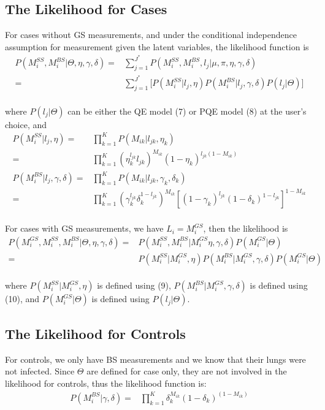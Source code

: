 \documentclass[11 pt, a4paper]{article}  %
\begin{document}
\subsection{The Likelihood for Cases}
For cases without GS measurements, and under the conditional independence assumption for measurement given the latent variables, the likelihood function is
\begin{align*}
 P(M_i^{SS},M_i^{BS} | \Theta, \eta, \gamma, \delta) 
 = & \sum_{j = 1}^{J^*}  P(M_i^{SS},M_i^{BS}, l_j | \mu, \pi, \eta, \gamma, \delta)  \\ 
= & \sum_{j = 1}^{J^*} \big[ P(M_i^{SS} | l_j, \eta) P(M_i^{BS} | l_j, \gamma, \delta) P(l_j |\Theta) \big ] 
\end{align*}
\\
where $P(l_j |\Theta)$ can be either the QE model (7) or PQE model (8) at the user's choice, and
\begin{align}
P(M_i^{SS} | l_j, \eta) = & \prod_{k=1}^K P(M_{ik} | l_{jk}, \eta_k) \nonumber \\
 = & \prod_{k=1}^K (\eta_k^{l_{jk}}l_{jk})^{M_{ik}} (1-\eta_k)^{l_{jk}(1-M_{ik})}\\
P(M_i^{BS} | l_j, \gamma, \delta) = & \prod_{k=1}^K P(M_{ik} | l_{jk}, \gamma_k, \delta_k) \nonumber \\
 = & \prod_{k=1}^K (\gamma_k^{l_{jk}} \delta_k^{1-l_{jk}})^{M_{ik}} [(1-\gamma_k)^{l_{jk}} (1-\delta_k)^{1-l_{jk}}]^{1-M_{ik}}
\end{align}
\\
For cases with GS measurements, we have $L_i = M_i^{GS}$, then the likelihood is 
\begin{align*}
 P(M_i^{GS},M_i^{SS},M_i^{BS} | \Theta, \eta, \gamma, \delta) 
= & P(M_i^{SS},M_i^{BS} | M_i^{GS} \eta, \gamma, \delta) P(M_i^{GS} | \Theta)\\
= & P(M_i^{SS}| M_i^{GS}, \eta) P(M_i^{BS} | M_i^{GS}, \gamma, \delta) P(M_i^{GS} | \Theta)
\end{align*}
\\
where $P(M_i^{SS}| M_i^{GS}, \eta)$ is defined using (9), $P(M_i^{BS} | M_i^{GS}, \gamma, \delta)$ is defined using (10), and $P(M_i^{GS} | \Theta)$ is defined using $P(l_j |\Theta)$.\\

\subsection{The Likelihood for Controls}
For controls, we only have BS measurements and we know that their lungs were not infected. Since $\Theta$ are defined for case only, they are not involved in the likelihood for controls, thus the likelihood function is:
\begin{align*}
 P(M_i^{BS} |\gamma, \delta) = & \prod_{k=1}^K \delta_k^{M_{ik}}(1-\delta_k)^{(1-M_{ik})}
\end{align*}
\\
\end{document}
